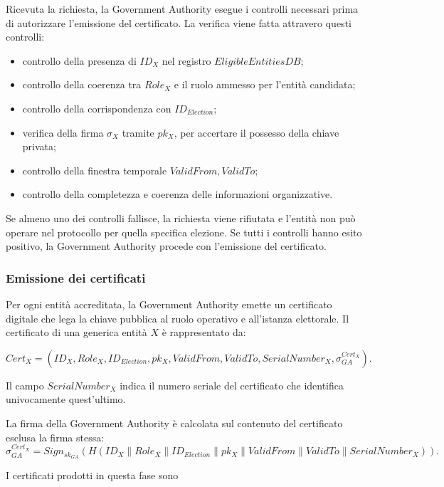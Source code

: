 \documentclass[a4paper,12pt]{article}
\begin{document}
Ricevuta la richiesta, la Government Authority esegue i controlli necessari prima di autorizzare l'emissione del certificato. La verifica viene fatta attravero questi controlli:

\begin{itemize}
	\item controllo della presenza di \(ID_X\) nel registro \(EligibleEntitiesDB\);
	\item controllo della coerenza tra \(Role_X\) e il ruolo ammesso per l'entit\`a candidata;
	\item controllo della corrispondenza con \(ID_{Election}\);
	\item verifica della firma \(\sigma_X\) tramite \(pk_X\), per accertare il possesso della chiave privata;
	\item controllo della finestra temporale \(ValidFrom, ValidTo\);
	\item controllo della completezza e coerenza delle informazioni organizzative.
\end{itemize}

Se almeno uno dei controlli fallisce, la richiesta viene rifiutata e l'entit\`a non pu\`o operare nel protocollo per quella specifica elezione. 
Se tutti i controlli hanno esito positivo, la Government Authority procede con l'emissione del certificato.

\subsubsection{Emissione dei certificati}

Per ogni entit\`a accreditata, la Government Authority emette un certificato digitale che lega la chiave pubblica al ruolo operativo e all'istanza elettorale. 
Il certificato di una generica entit\`a \(X\) \`e rappresentato da:

\[
	Cert_X =
	(ID_X, Role_X, ID_{Election}, pk_X, ValidFrom, ValidTo, SerialNumber_X, \sigma_{GA}^{Cert_X}).
\]

Il campo $SerialNumber_X$ indica il numero seriale del certificato che identifica univocamente quest'ultimo.

La firma della Government Authority \`e calcolata sul contenuto del certificato esclusa la firma stessa:
\[
	\sigma_{GA}^{Cert_X} =
	Sign_{sk_{GA}}(H(ID_X \parallel Role_X \parallel ID_{Election} \parallel pk_X \parallel ValidFrom \parallel ValidTo \parallel SerialNumber_X)).
\]

I certificati prodotti in questa fase sono
\end{document}
